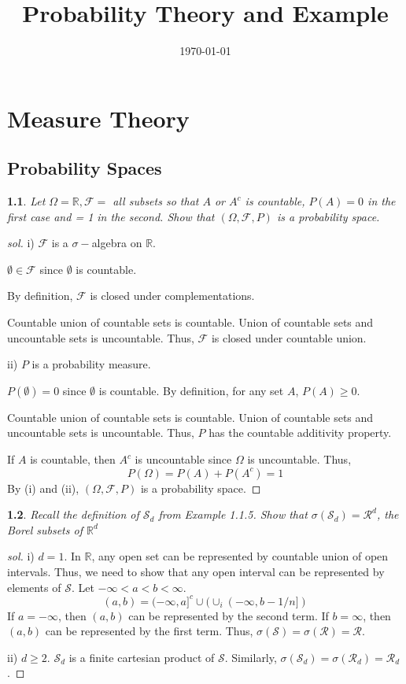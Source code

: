 \documentclass{report}
\newtheorem{ex}{}[section]
\newcommand\frontmatter{%
    \clearpage
  \pagenumbering{roman}}
\newcommand\mainmatter{%
    \clearpage
  \pagenumbering{arabic}}
\begin{document}
\title{Probability Theory and Example}
\author{}
\date{\today}
\maketitle

\frontmatter
\tableofcontents
\mainmatter

\chapter{Measure Theory}
\section{Probability Spaces}
\begin{ex}
Let $\Omega = \mathbb{R}, \mathcal{F} =$ all subsets so that $A$ or $A^c$ is countable, $P(A) = 0$ in the first case and = 1 in the second. Show that $(\Omega, \mathcal{F}, P)$ is a probability space.
\end{ex}
\begin{proof}[sol]
i) $\mathcal{F}$ is a $\sigma-$algebra on $\mathbb{R}$.

$\emptyset \in \mathcal{F}$ since $\emptyset$ is countable.

By definition, $\mathcal{F}$ is closed under complementations.

Countable union of countable sets is countable.  Union of countable sets and uncountable sets is uncountable. Thus, $\mathcal{F}$ is closed under countable union. 

ii) $P$ is a probability measure.

$P(\emptyset) = 0$ since $\emptyset$ is countable. By definition, for any set $A$, $P(A) \ge 0$.

Countable union of countable sets is countable.  Union of countable sets and uncountable sets is uncountable. Thus, $P$ has the countable additivity property. 

If $A$ is countable, then $A^c$ is uncountable since $\Omega$ is uncountable. Thus,
\[P(\Omega) = P(A) + P(A^c) = 1\]
By (i) and (ii), $(\Omega, \mathcal{F}, P)$ is a probability space.
\end{proof}
\begin{ex}
Recall the definition of $\mathcal{S}_d$ from Example 1.1.5. Show that $\sigma (\mathcal{S}_d) =\mathcal{R}^d$, the Borel subsets of $\mathbb{R}^d$
\end{ex}
\begin{proof}[sol]
i) $d = 1$. In $\mathbb{R}$, any open set can be represented by countable union of open intervals. Thus, we need to show that any open interval can be represented by elements of $\mathcal{S}$. Let $-\infty < a <  b < \infty$.
\[(a,b) = (-\infty, a]^c \cup (\cup_i(-\infty, b - 1/n])\]
If $a = -\infty$, then $(a,b)$ can be represented by the second term. If $b =  \infty$, then $(a,b)$ can be represented by the first term. Thus, $\sigma(\mathcal{S}) = \sigma(\mathcal{R}) = \mathcal{R}$.

ii) $d \ge 2$. $\mathcal{S}_d$ is a finite cartesian product of $\mathcal{S}$. Similarly, $\sigma(\mathcal{S}_d) = \sigma(\mathcal{R}_d) = \mathcal{R}_d$.
\end{proof}
\end{document}
